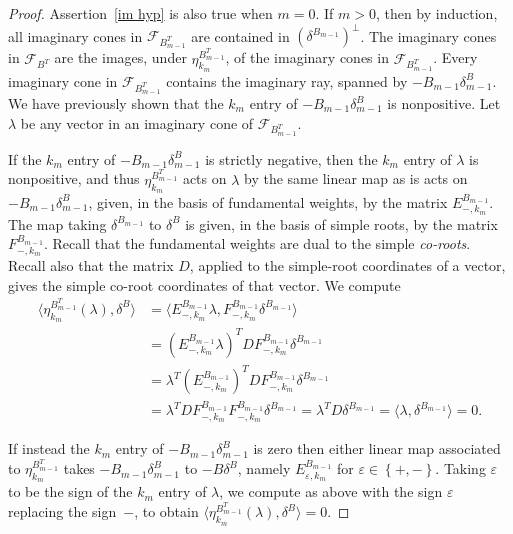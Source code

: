 \documentclass{amsart}
\newtheorem{proposition}{Proposition}[section]
\theoremstyle{definition}
\theoremstyle{remark}
\numberwithin{equation}{section}
\newcommand{\ep}{\varepsilon}
\newcommand{\set}[1]{{\left\lbrace #1 \right\rbrace}}
\newcommand{\br}[1]{{\langle #1 \rangle}}
\newcommand{\F}{{\mathcal F}}
\newcommand{\0}{{\mathbf{0}}}
\renewcommand{\d}{{\mathfrak d}}
\begin{document}
\begin{proof}
Assertion~\ref{im hyp} is also true when $m=0$.
If $m>0$, then by induction, all imaginary cones in $\F_{B_{m-1}^T}$ are contained in $(\delta^{B_{m-1}})^\perp$.
The imaginary cones in $\F_{B^T}$ are the images, under $\eta^{B^T_{m-1}}_{k_m}$, of the imaginary cones in $\F_{B_{m-1}^T}$.
Every imaginary cone in $\F_{B_{m-1}^T}$ contains the imaginary ray, spanned by $-B_{m-1}\delta^B_{m-1}$.
We have previously shown that the $k_m$ entry of $-B_{m-1}\delta^B_{m-1}$ is nonpositive.
Let $\lambda$ be any vector in an imaginary cone of $\F_{B_{m-1}^T}$.

If the $k_m$ entry of $-B_{m-1}\delta^B_{m-1}$ is strictly negative, then the $k_m$ entry of $\lambda$ is nonpositive, and thus $\eta^{B^T_{m-1}}_{k_m}$ acts on $\lambda$ by the same linear map as is acts on $-B_{m-1}\delta^B_{m-1}$, given, in the basis of fundamental weights, by the matrix $E_{-,k_m}^{B_{m-1}}$.
The map taking $\delta^{B_{m-1}}$ to $\delta^B$ is given, in the basis of simple roots, by the matrix $F_{-,k_m}^{B_{m-1}}$.
Recall that the fundamental weights are dual to the simple \emph{co-roots}.
Recall also that the matrix $D$, applied to the simple-root coordinates of a vector, gives the simple co-root coordinates of that vector.
We compute
\begin{align*}
\br{\eta^{B^T_{m-1}}_{k_m}(\lambda),\delta^B}
&=\br{E_{-,k_m}^{B_{m-1}}\lambda,F_{-,k_m}^{B_{m-1}}\delta^{B_{m-1}}}\\
&=(E_{-,k_m}^{B_{m-1}}\lambda)^TDF_{-,k_m}^{B_{m-1}}\delta^{B_{m-1}}\\
&=\lambda^T(E_{-,k_m}^{B_{m-1}})^TDF_{-,k_m}^{B_{m-1}}\delta^{B_{m-1}}\\
&=\lambda^TDF_{-,k_m}^{B_{m-1}}F_{-,k_m}^{B_{m-1}}\delta^{B_{m-1}}=\lambda^TD\delta^{B_{m-1}}=\br{\lambda,\delta^{B_{m-1}}}=0.
\end{align*}

If instead the $k_m$ entry of $-B_{m-1}\delta^B_{m-1}$ is zero then either linear map associated to $\eta^{B^T_{m-1}}_{k_m}$ takes $-B_{m-1}\delta^B_{m-1}$ to $-B\delta^B$, namely $E_{\ep,k_m}^{B_{m-1}}$ for $\ep\in\set{+,-}$.
Taking $\ep$ to be the sign of the $k_m$ entry of $\lambda$, we compute as above with the sign $\ep$ replacing the sign~$-$, to obtain $\br{\eta^{B^T_{m-1}}_{k_m}(\lambda),\delta^B}=0$.
\end{proof}


%
%
%
\end{document}
